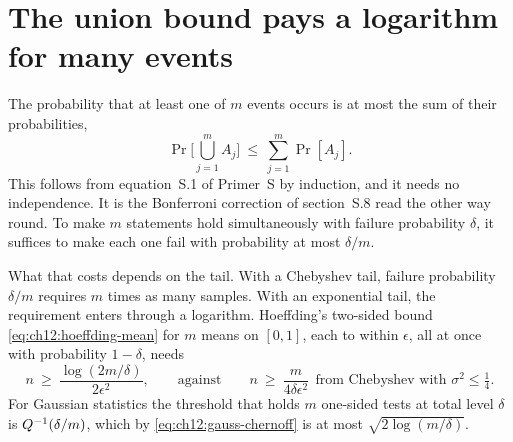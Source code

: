 

\section{The union bound pays a logarithm for many events}\label{sec:ch12:union}

The probability that at least one of $m$ events occurs is at most the sum of their probabilities,
\begin{equation}
\Pr\Big[\bigcup_{j=1}^mA_j\Big]\ \le\ \sum_{j=1}^m\Pr[A_j].
\label{eq:ch12:union}
\end{equation}
This follows from equation~S.1 of Primer~S by induction, and it needs no independence. It is the Bonferroni correction of section~S.8 read the other way round. To make $m$ statements hold simultaneously with failure probability $\delta$, it suffices to make each one fail with probability at most $\delta/m$.

What that costs depends on the tail. With a Chebyshev tail, failure probability $\delta/m$ requires $m$ times as many samples. With an exponential tail, the requirement enters through a logarithm. Hoeffding's two-sided bound \cref{eq:ch12:hoeffding-mean} for $m$ means on $[0,1]$, each to within $\epsilon$, all at once with probability $1-\delta$, needs
\begin{equation}
n\ \ge\ \frac{\log(2m/\delta)}{2\epsilon^2},
\qquad\text{against}\qquad
n\ \ge\ \frac{m}{4\delta\epsilon^2}\ \ \text{from Chebyshev with }\sigma^2\le\tfrac14.
\label{eq:ch12:union-n}
\end{equation}
For Gaussian statistics the threshold that holds $m$ one-sided tests at total level $\delta$ is $Q^{-1}(\delta/m)$, which by \cref{eq:ch12:gauss-chernoff} is at most $\sqrt{2\log(m/\delta)}$.

